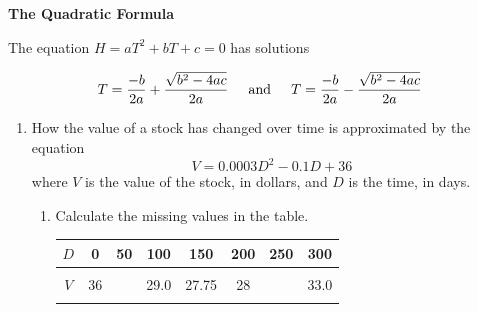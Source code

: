 \documentclass[11pt]{article}
\begin{document}
 \vspace{.2in}
 
 \begin{center}
\textbf{The Quadratic Formula}
\vspace{.1in}

The equation $H=aT^2+bT+c=0$ has solutions 


$$\displaystyle T=\frac{-b}{2a} + \frac{\sqrt{b^2-4ac}}{2a} \hspace{.2in} \text{and} \hspace{.2in}T=\frac{-b}{2a} - \frac{\sqrt{b^2-4ac}}{2a}$$

 \end{center}

\hrulefill

\newpage

\begin{enumerate}

\item How the value of a stock has changed over time is approximated by the equation $$V = 0.0003D^2-0.1D+36$$
where $V$ is the value of the stock, in dollars, and $D$ is the time, in days.

\begin{enumerate}
\item Calculate the missing values in the table.


\begin{center}
\begin{tabular} {|c ||c |c |c |c |c |c |c |} \hline
$D$ & \hspace{.25in}0  \hspace{.25in}   &\hspace{.25in} 50 \hspace{.25in} & \hspace{.25in} 100   \hspace{.25in} &\hspace{.25in} 150  \hspace{.25in}  & \hspace{.25in} 200   \hspace{.25in}  & \hspace{.25in}250  \hspace{.25in}& \hspace{.25in} 300 \hspace{.25in}  \\ \hline
&&&&&&& \\
$V$ &36 &  & 29.0 & 27.75 & 28 &   & 33.0  \\ 
&&&&&&& \\ \hline
\end{tabular}
\end{center}


\end{enumerate}
\end{enumerate}
\end{document}

